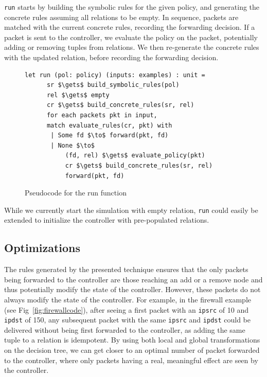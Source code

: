 \documentclass[preprint]{sigplanconf}
\begin{document}
\lstinline|run| starts by building the symbolic rules for the given policy, and generating the concrete rules assuming all relations to be empty. In sequence, packets are matched with the current concrete rules, recording the forwarding decision. If a packet is sent to the controller, we evaluate the policy on the packet, potentially adding or removing tuples from relations. We then re-generate the concrete rules with the updated relation, before recording the forwarding decision.

\begin{figure}[ht]
\begin{lstlisting}[mathescape]
let run (pol: policy) (inputs: examples) : unit =
      sr $\gets$ build_symbolic_rules(pol)
      rel $\gets$ empty
      cr $\gets$ build_concrete_rules(sr, rel)
      for each packets pkt in input,
      match evaluate_rules(cr, pkt) with
       | Some fd $\to$ forward(pkt, fd)
       | None $\to$
           (fd, rel) $\gets$ evaluate_policy(pkt)
           cr $\gets$ build_concrete_rules(sr, rel)
           forward(pkt, fd)     
\end{lstlisting}

\caption{Pseudocode for the run function}
\label{fig:run-pseudo}
  \end{figure}

While we currently start the simulation with empty relation, \lstinline|run| could easily be extended to initialize the controller with pre-populated relations. 



\subsection*{Optimizations}
The rules generated by the presented technique ensures that the only packets being forwarded to the controller are those reaching an add or a remove node and thus potentially modify the state of the controller. However, these packets do not always modify the state of the controller. For example, in the firewall example (see Fig~\ref{fig:firewallcode}), after seeing a first packet with an \lstinline|ipsrc| of 10 and \lstinline|ipdst| of 150, any subsequent packet with the same \lstinline|ipsrc| and \lstinline|ipdst| could be delivered without being first forwarded to the controller, as adding the same tuple to a relation is idempotent. By using both local and global transformations on the decision tree, we can get closer to an optimal number of packet forwarded to the controller, where only packets having a real, meaningful effect are seen by the controller.
\end{document}
